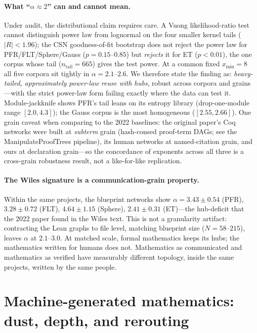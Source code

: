 \documentclass[11pt]{article}
\begin{document}
\paragraph{What ``$\alpha \approx 2$'' can and cannot mean.} Under audit, the distributional
claim requires care. A Vuong likelihood-ratio test cannot distinguish power law from lognormal
on the four smaller kernel tails ($|R| < 1.96$); the CSN goodness-of-fit bootstrap does not
reject the power law for PFR/FLT/Sphere/Gauss ($p = 0.15$--$0.85$) but \emph{rejects} it for ET
($p < 0.01$), the one corpus whose tail ($n_{\text{tail}} = 665$) gives the test power. At a
common fixed $x_{\min} = 8$ all five corpora sit tightly in $\alpha = 2.1$--$2.6$. We therefore
state the finding as: \emph{heavy-tailed, approximately power-law reuse with hubs}, robust
across corpora and grains---with the strict power-law form failing exactly where the data can
test it. Module-jackknife shows PFR's tail leans on its entropy library (drop-one-module range
$[2.0, 4.3]$); the Gauss corpus is the most homogeneous ($[2.55, 2.66]$). One grain caveat when
comparing to the 2022 baselines: the original paper's Coq networks were built at \emph{subterm}
grain (hash-consed proof-term DAGs; see the ManipulateProofTrees pipeline), its human networks at
named-citation grain, and ours at declaration grain---so the concordance of exponents across all
three is a cross-grain robustness result, not a like-for-like replication.

\paragraph{The Wiles signature is a communication-grain property.} Within the same projects,
the blueprint networks show $\alpha = 3.43 \pm 0.54$ (PFR), $3.28 \pm 0.72$ (FLT),
$4.64 \pm 1.15$ (Sphere), $2.41 \pm 0.31$ (ET)---the hub-deficit that the 2022 paper found in
the Wiles text. This is not a granularity artifact: contracting the Lean graphs to file level,
matching blueprint size ($N = 58$--$215$), leaves $\alpha$ at $2.1$--$3.0$. At matched scale,
formal mathematics keeps its hubs; the mathematics written for humans does not. Mathematics as
communicated and mathematics as verified have measurably different topology, inside the same
projects, written by the same people.

\section{Machine-generated mathematics: dust, depth, and rerouting}
\label{sec:machine}
\end{document}
